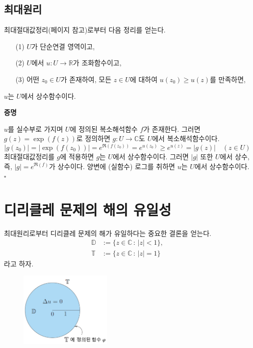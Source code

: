 \subsection{최대원리}

최대절대값정리(\pageref{sec-4-6}페이지 참고)로부터 %
다음 정리를 얻는다.

\begin{salttheorem} [최대원리] {}{} \label{thm-5-4}

\begin{itemize}
\item[(1)] $U$가 단순연결 영역이고,
\item[(2)] $U$에서 $u:U\to\mathbb R$가 조화함수이고,
\item[(3)] 어떤 $z_0\in U$가 존재하여, 모든 $z\in U$에 대하여 $u(z_0) \ge u(z)$를 만족하면,
\end{itemize}
$u$는 $U$에서 상수함수이다.
\end{salttheorem}

{\bf 증명}

$u$를 실수부로 가지며 $U$에 정의된 복소해석함수 $f$가 존재한다.
그러면 $g(z)=\exp(f(z))$로 정의하면
$g:U\to\mathbb C$도 $U$에서 복소해석함수이다.
\[
|g(z_0)| = |\exp(f(z_0))| = e^{\Re(f(z_0))}
= e^{u(z_0)} \ge e^{u(z)} = |g(z)|
\quad (z\in U)
\]
최대절대값정리를 $g$에 적용하면
$g$는 $U$에서 상수함수이다.
그러면 $|g|$ 또한 $U$에서 상수, 즉, $|g| = e^{\Re(f)}$가 상수이다.
양변에 (실함수) 로그를 취하면 $u$는  $U$에서 상수함수이다.
\hfill $\square$

\section{디리클레 문제의 해의 유일성}

최대원리로부터 디리클레 문제의 해가 유일하다는 중요한 결론을 얻는다.
\begin{align*}
\mathbb D&:= \{ z\in\mathbb C\,:\, |z|<1\},\\
\mathbb T&:= \{ z\in\mathbb C\,:\, |z|=1\}
\end{align*}
라고 하자.

\begin{figure}[h!]
\begin{center}
\includegraphics[width=0.4\textwidth]{./SaltChapter/figs/fig-5-0-2-kr}
\end{center}
\end{figure}

